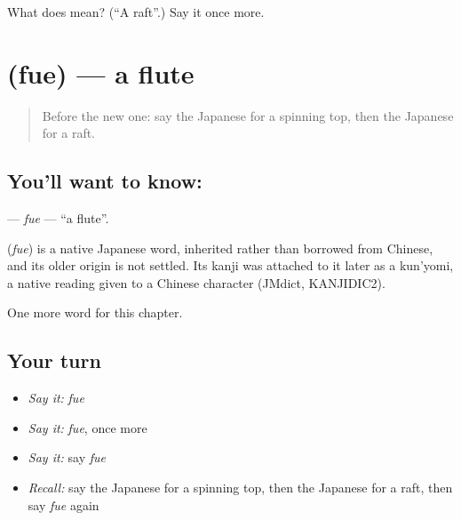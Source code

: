 \begin{tcolorbox}[breakable,colback=teal!4,colframe=teal!35!black,title={Before you move on}]
What does  mean? (\textquotedblleft{}A raft\textquotedblright{}.) Say it once more.
\end{tcolorbox}
\section[\texorpdfstring{\ja{ふえ} (fue)}{ふえ (fue)}]{ (fue) — a flute}

\label{lesson:JA-C66-fue}



\begin{quote}
Before the new one: say the Japanese for a spinning top, then the Japanese for a raft.
\end{quote}

\subsection*{You'll want to know: }
\textbf{} — \emph{fue} — \textquotedblleft{}a flute\textquotedblright{}.

\begin{cousinweb}
\textbf{} (\emph{fue}) is a native Japanese word, inherited rather than borrowed from Chinese, and its older origin is not settled. Its kanji was attached to it later as a kun'yomi, a native reading given to a Chinese character (JMdict, KANJIDIC2).
\end{cousinweb}

\begin{grammarlens}[title={What you've built}]
One more word for this chapter.
\end{grammarlens}

\subsection*{Your turn}
\begin{itemize}
\raggedright
  \item \emph{Say it:} \emph{fue}
  \item \emph{Say it:} \emph{fue}, once more
  \item \emph{Say it:} say \emph{fue}
  \item \emph{Recall:} say the Japanese for a spinning top, then the Japanese for a raft, then say \emph{fue} again
\end{itemize}

